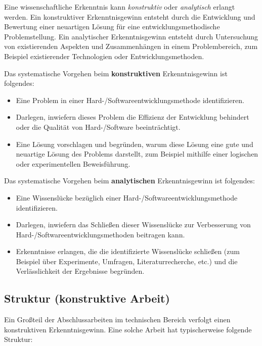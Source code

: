 Eine wissenschaftliche Erkenntnis kann \textit{konstruktiv} oder \textit{analytisch} erlangt werden. 
Ein konstruktiver Erkenntnisgewinn entsteht durch die Entwicklung und Bewertung einer neuartigen Lösung für eine entwicklungsmethodische Problemstellung.
Ein analytischer Erkenntnisgewinn entsteht durch Untersuchung von existierenden Aspekten und Zusammenhängen in einem Problembereich, zum Beispiel existierender Technologien oder Entwicklungsmethoden.

Das systematische Vorgehen beim \textbf{konstruktiven} Erkenntnisgewinn ist folgendes:
\begin{itemize}
    \item Eine Problem in einer Hard-/Softwareentwicklungsmethode identifizieren.
    \item Darlegen, inwiefern dieses Problem die Effizienz der Entwicklung behindert oder die Qualität von Hard-/Software beeinträchtigt.
    \item Eine Lösung vorschlagen und begründen, warum diese Lösung eine gute und neuartige Lösung des Problems darstellt, zum Beispiel mithilfe einer logischen oder experimentellen Beweisführung.
\end{itemize}

Das systematische Vorgehen beim \textbf{analytischen} Erkenntnisgewinn ist folgendes:
\begin{itemize}
    \item Eine Wissenslücke bezüglich einer Hard-/Softwareentwicklungsmethode identifizieren.
    \item Darlegen, inwiefern das Schließen dieser Wissenslücke zur Verbesserung von Hard-/Softwareentwicklungsmethoden beitragen kann.
    \item Erkenntnisse erlangen, die die identifizierte Wissenslücke schließen (zum Beispiel über Experimente, Umfragen, Literaturrecherche, etc.) und die Verlässlichkeit der Ergebnisse begründen.
\end{itemize}



\subsection{Struktur (konstruktive Arbeit)}

Ein Großteil der Abschlussarbeiten im technischen Bereich verfolgt einen konstruktiven Erkenntnisgewinn. Eine solche Arbeit hat typischerweise folgende Struktur:

